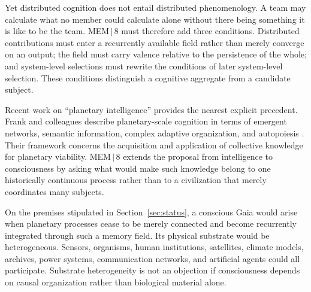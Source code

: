 \documentclass[11pt]{article}
\begin{document}
Yet distributed cognition does not entail distributed phenomenology. A team may calculate what no member could calculate alone without there being something it is like to be the team. MEM\,$|$\,8 must therefore add three conditions. Distributed contributions must enter a recurrently available field rather than merely converge on an output; the field must carry valence relative to the persistence of the whole; and system-level selections must rewrite the conditions of later system-level selection. These conditions distinguish a cognitive aggregate from a candidate subject.

Recent work on ``planetary intelligence'' provides the nearest explicit precedent. Frank and colleagues describe planetary-scale cognition in terms of emergent networks, semantic information, complex adaptive organization, and autopoiesis \cite{frank2022}. Their framework concerns the acquisition and application of collective knowledge for planetary viability. MEM\,$|$\,8 extends the proposal from intelligence to consciousness by asking what would make such knowledge belong to one historically continuous process rather than to a civilization that merely coordinates many subjects.

On the premises stipulated in Section~\ref{sec:status}, a conscious Gaia would arise when planetary processes cease to be merely connected and become recurrently integrated through such a memory field. Its physical substrate would be heterogeneous. Sensors, organisms, human institutions, satellites, climate models, archives, power systems, communication networks, and artificial agents could all participate. Substrate heterogeneity is not an objection if consciousness depends on causal organization rather than biological material alone.
\end{document}
